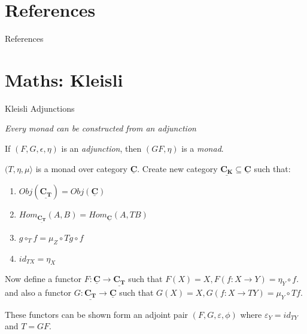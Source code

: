 \documentclass[10pt]{beamer}
\newcommand{\Cat}[1]{\ensuremath{\underline{\mathbf{#1}}}}
\theoremstyle{definition}
\theoremstyle{remark}
\numberwithin{equation}{section}
\begin{document}
\section{References}

\begin{frame}[allowframebreaks]{References}

  
  

\end{frame}

\section{Maths: Kleisli}

\begin{frame}[fragile]{Kleisli Adjunctions}

  \emph{Every monad can be constructed from an adjunction}

  If $(F,G,\epsilon,\eta)$ is an \emph{adjunction}, then $(GF,\eta)$ is a \emph{monad}.

  $(T,\eta,\mu〉$ is a monad over category $\Cat{C}$.
    Create new category $\Cat{C_K} \subseteq \Cat{C}$ such that:

    \begin{enumerate}
      \item $Obj(\Cat{C_T}) = Obj(\Cat{C})$
      \item $Hom_{\Cat{C_T}}(A,B) = Hom_{\Cat{C}}(A,T B)$
      \item $g \circ_{T} f = \mu_{Z} \circ T g \circ f $
      \item $id_{TX} = \eta_{X} $
    \end{enumerate}

    Now define a functor $ F : \Cat{C} \rightarrow \Cat{C_T} $ such that $ F(X) = X, F(f:X\rightarrow Y) = \eta_Y\circ f$.
    and also a functor $ G : \Cat{C_T} \rightarrow \Cat{C} $ such that $ G(X) = X, G(f:X\rightarrow TY) = \mu_Y\circ Tf$.

    These functors can be shown form an adjoint pair $(F,G,\varepsilon,\phi)$ where $\varepsilon_{Y} = id_{TY}$ and $T = GF$.
    
\end{frame}
\end{document}
